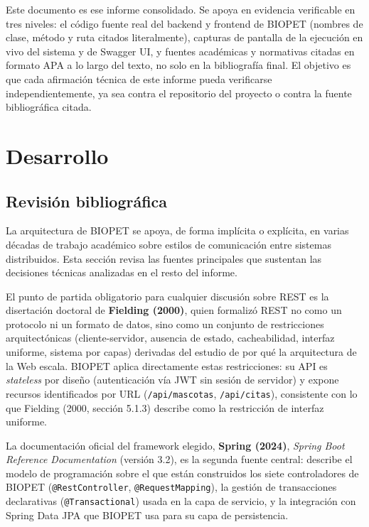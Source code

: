 \documentclass[11pt,a4paper]{article}
\begin{document}
Este documento es ese informe consolidado. Se apoya en evidencia
verificable en tres niveles: el código fuente real del backend y frontend
de BIOPET (nombres de clase, método y ruta citados literalmente), capturas
de pantalla de la ejecución en vivo del sistema y de Swagger UI, y fuentes
académicas y normativas citadas en formato APA a lo largo del texto, no
solo en la bibliografía final. El objetivo es que cada afirmación técnica
de este informe pueda verificarse independientemente, ya sea contra el
repositorio del proyecto o contra la fuente bibliográfica citada.

\section{Desarrollo}

\subsection{Revisión bibliográfica}

La arquitectura de BIOPET se apoya, de forma implícita o explícita, en
varias décadas de trabajo académico sobre estilos de comunicación entre
sistemas distribuidos. Esta sección revisa las fuentes principales que
sustentan las decisiones técnicas analizadas en el resto del informe.

El punto de partida obligatorio para cualquier discusión sobre REST es la
disertación doctoral de \textbf{Fielding (2000)}, quien formalizó REST no
como un protocolo ni un formato de datos, sino como un conjunto de
restricciones arquitectónicas (cliente-servidor, ausencia de estado,
cacheabilidad, interfaz uniforme, sistema por capas) derivadas del estudio
de por qué la arquitectura de la Web escala. BIOPET aplica directamente
estas restricciones: su API es \emph{stateless} por diseño (autenticación
vía JWT sin sesión de servidor) y expone recursos identificados por URL
(\texttt{/api/mascotas}, \texttt{/api/citas}), consistente con lo que
Fielding (2000, sección 5.1.3) describe como la restricción de interfaz
uniforme.

La documentación oficial del framework elegido, \textbf{Spring (2024)},
\emph{Spring Boot Reference Documentation} (versión 3.2), es la segunda
fuente central: describe el modelo de programación sobre el que están
construidos los siete controladores de BIOPET (\texttt{@RestController},
\texttt{@RequestMapping}), la gestión de transacciones declarativas
(\texttt{@Transactional}) usada en la capa de servicio, y la integración
con Spring Data JPA que BIOPET usa para su capa de persistencia.
\end{document}
